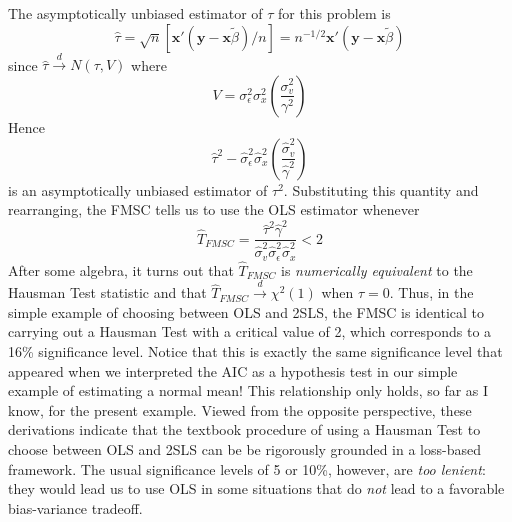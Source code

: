 \documentclass[12pt]{article}
\theoremstyle{definition}
\begin{document}
The asymptotically unbiased estimator of $\tau$ for this problem is 
  $$\widehat{\tau} = \sqrt{n} \left[\mathbf{x}'(\mathbf{y} - \mathbf{x}\widetilde{\beta})/n\right] = n^{-1/2}\mathbf{x}'(\mathbf{y} - \mathbf{x}\widetilde{\beta})$$ 
since $\widehat{\tau} \overset{d}{\rightarrow} N(\tau, V)$ where
    $$V = \sigma^2_\epsilon \sigma^2_x \left( \frac{\sigma^2_v}{\gamma^2}\right)$$
Hence
	$$\widehat{\tau}^2 - \widehat{\sigma}_\epsilon^2\widehat{\sigma}_x^2 \left(\frac{\widehat{\sigma}_v^2}{\widehat{\gamma}^2}\right)$$
is an asymptotically unbiased estimator of $\tau^2$. Substituting this quantity and rearranging, the FMSC tells us to use the OLS estimator whenever
	$$\widehat{T}_{FMSC} = \frac{\widehat{\tau}^2 \widehat{\gamma}^2}{\widehat{\sigma}_v^2 \widehat{\sigma}_\epsilon^2 \widehat{\sigma}_x^2} < 2$$
After some algebra, it turns out that $\widehat{T}_{FMSC}$ is \emph{numerically equivalent} to the Hausman Test statistic and that $\widehat{T}_{FMSC} \overset{d}{\rightarrow} \chi^2(1)$ when $\tau = 0$. Thus, in the simple example of choosing between OLS and 2SLS, the FMSC is identical to carrying out a Hausman Test with a critical value of 2, which corresponds to a 16\% significance level. Notice that this is exactly the same significance level that appeared when we interpreted the AIC as a hypothesis test in our simple example of estimating a normal mean! This relationship only holds, so far as I know, for the present example. Viewed from the opposite perspective, these derivations indicate that the textbook procedure of using a Hausman Test to choose between OLS and 2SLS can be be rigorously grounded in a loss-based framework. The usual significance levels of 5 or 10\%, however, are \emph{too lenient}: they would lead us to use OLS in some situations that do \emph{not} lead to a favorable bias-variance tradeoff. 
\end{document}
